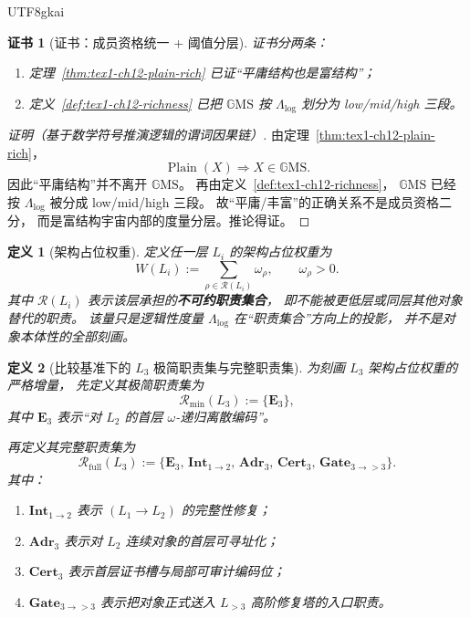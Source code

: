 \documentclass[12pt]{article}
\newtheorem{definition}{定义}[section]
\newtheorem{Certificate}{证书}[section]
\newcommand{\GMS}{\mathbb{G}\mathrm{MS}}
\begin{document}
\begin{CJK*}{UTF8}{gkai}
\begin{Certificate}[证书：成员资格统一 + 阈值分层]
\label{cert:tex1-ch12-layering}
证书分两条：
\begin{enumerate}
  \item 定理~\ref{thm:tex1-ch12-plain-rich} 已证“平庸结构也是富结构”；
  \item 定义~\ref{def:tex1-ch12-richness} 已把 \(\GMS\) 按 \(\Lambda_{\mathrm{log}}\) 划分为 low/mid/high 三段。
\end{enumerate}
\end{Certificate}

\begin{proof}[证明（基于数学符号推演逻辑的谓词因果链）]
由定理~\ref{thm:tex1-ch12-plain-rich}，
\[
  \operatorname{Plain}(X)\Rightarrow X\in \GMS.
\]
因此“平庸结构”并不离开 \(\GMS\)。
再由定义~\ref{def:tex1-ch12-richness}，
\(\GMS\) 已经按 \(\Lambda_{\mathrm{log}}\) 被分成 low/mid/high 三段。
故“平庸/丰富”的正确关系不是成员资格二分，
而是富结构宇宙内部的度量分层。推论得证。
\end{proof}

\begin{definition}[架构占位权重]
\label{def:tex1-ch12-weight}
定义任一层 \(L_i\) 的架构占位权重为
\[
  W(L_i)
  :=
  \sum_{\rho\in \mathcal R(L_i)}\omega_\rho,
  \qquad
  \omega_\rho>0.
\]
其中 \(\mathcal R(L_i)\) 表示该层承担的\textbf{不可约职责集合}，
即不能被更低层或同层其他对象替代的职责。
该量只是逻辑性度量 \(\Lambda_{\mathrm{log}}\) 在“职责集合”方向上的投影，
并不是对象本体性的全部刻画。
\end{definition}

\begin{definition}[比较基准下的 \(L_3\) 极简职责集与完整职责集]
\label{def:tex1-ch12-role-set}
为刻画 \(L_3\) 架构占位权重的严格增量，
先定义其极简职责集为
\[
  \mathcal R_{\mathrm{min}}(L_3)
  :=
  \{\mathbf E_3\},
\]
其中 \(\mathbf E_3\) 表示“对 \(L_2\) 的首层 \(\omega\)-递归离散编码”。

再定义其完整职责集为
\[
  \mathcal R_{\mathrm{full}}(L_3)
  :=
  \{
    \mathbf E_3,\,
    \mathbf{Int}_{1\to2},\,
    \mathbf{Adr}_3,\,
    \mathbf{Cert}_3,\,
    \mathbf{Gate}_{3\to >3}
  \}.
\]
其中：
\begin{enumerate}
  \item \(\mathbf{Int}_{1\to2}\) 表示 \((L_1\to L_2)\) 的完整性修复；
  \item \(\mathbf{Adr}_3\) 表示对 \(L_2\) 连续对象的首层可寻址化；
  \item \(\mathbf{Cert}_3\) 表示首层证书槽与局部可审计编码位；
  \item \(\mathbf{Gate}_{3\to >3}\) 表示把对象正式送入 \(L_{>3}\) 高阶修复塔的入口职责。
\end{enumerate}
\end{definition}


\end{CJK*}
\end{document}
